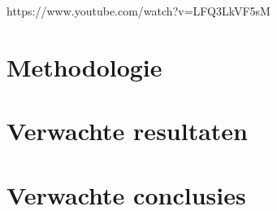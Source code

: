 \documentclass{hogent-article}
\begin{document}
https://www.youtube.com/watch?v=LFQ3LkVF5sM


\section{Methodologie}




\section{Verwachte resultaten}




\section{Verwachte conclusies}





\printbibliography[heading=bibintoc]
\end{document}
